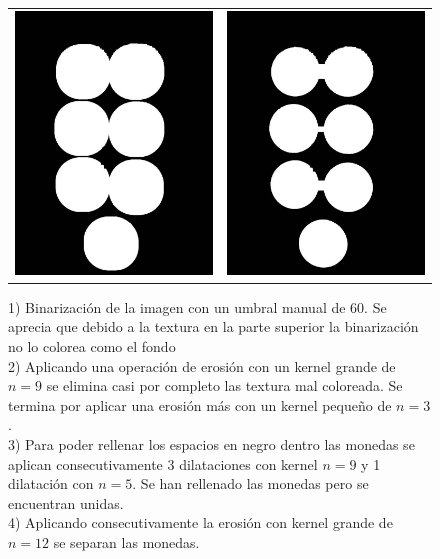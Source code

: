 \begin{figure}[!h]
\begin{tabular}{cc}
			\includegraphics[width=7.5cm]{Imagenes/op_morf_monedas_3.jpeg} & \includegraphics[width=7.5cm]{Imagenes/op_morf_monedas_4.jpeg} 
		\end{tabular}
		\caption{1) Binarización de la imagen con un umbral manual de 60. Se aprecia que debido a la textura en la parte superior la binarización no lo colorea como el fondo\\ 2) Aplicando una operación de erosión con un kernel grande de $n=9$ se elimina casi por completo las textura mal coloreada. Se termina por aplicar una erosión más con un kernel pequeño de $n=3$. \\ 3) Para poder rellenar los espacios en negro dentro las monedas se aplican consecutivamente 3 dilataciones con kernel $n=9$ y 1 dilatación con $n=5$. Se han rellenado las monedas pero se encuentran unidas. \\ 4) Aplicando consecutivamente la erosión con kernel grande de $n=12$ se separan las monedas. }
	\end{figure}

